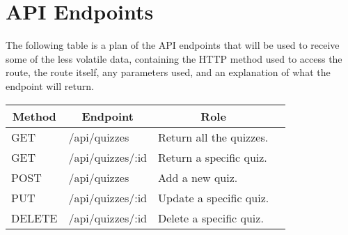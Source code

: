 \section{API Endpoints}
The following table is a plan of the API endpoints that will be used to receive some of the less volatile data, containing the HTTP method used to access the route, the route itself, any parameters used, and an explanation of what the endpoint will return.

\begin{table}[!htbp]
\centering
\label{my-label}
\begin{tabular}{|l|l|l|l|}
\hline
\multicolumn{1}{|c|}{{\bf Method}} & \multicolumn{1}{c|}{{\bf Endpoint}} & \multicolumn{1}{c|}{{\bf Role}} \\ \hline
GET                                & /api/quizzes                                                       & Return all the quizzes.         \\ \hline
GET                                & /api/quizzes/:id                                & Return a specific quiz.         \\ \hline
POST                               & /api/quizzes                                                       & Add a new quiz.                 \\ \hline
PUT                                & /api/quizzes/:id                                & Update a specific quiz.         \\ \hline
DELETE & /api/quizzes/:id & Delete a specific quiz. \\ \hline
\end{tabular}
\end{table}
